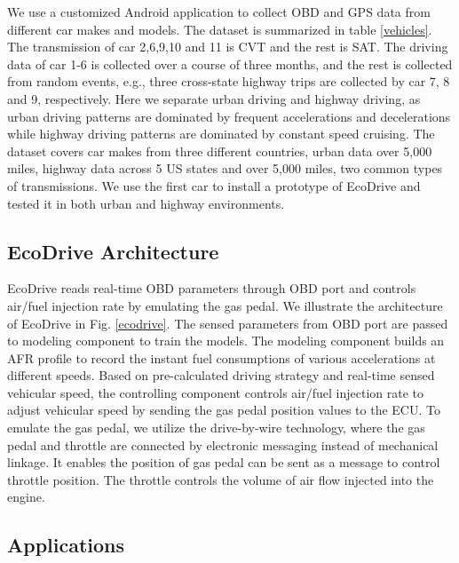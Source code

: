 

We use a customized Android application to collect OBD and GPS data 
from different car makes and models.
The dataset is summarized in table \ref{vehicles}.
The transmission of car 2,6,9,10 and 11 is CVT and the rest is SAT. 
The driving data of car 1-6 is collected over a course of three months, 
and the rest is collected from random events, 
e.g., three cross-state highway trips are collected by car 7, 8 and 9, 
respectively. 
Here we separate urban driving and highway driving,
as urban driving patterns are dominated by frequent 
accelerations and decelerations while 
highway driving patterns are dominated by 
constant speed cruising. 
The dataset covers car makes from three different countries, 
urban data over 5,000 miles, highway data across 5 US states and 
over 5,000 miles, two common types of transmissions. 
We use the first car to install a prototype of EcoDrive and tested
it in both urban and highway environments. 




\subsection{EcoDrive Architecture}

EcoDrive reads real-time OBD parameters through OBD port
and controls air/fuel injection rate by emulating the gas pedal.
We illustrate the architecture of EcoDrive in Fig. \ref{ecodrive}.
The sensed parameters from OBD port are passed to modeling component
to train the models.
The modeling component builds an AFR profile to 
record the instant fuel consumptions of various 
accelerations at different speeds.
Based on pre-calculated driving strategy and real-time sensed vehicular speed, 
the controlling component controls air/fuel injection rate to adjust vehicular speed by 
sending the gas pedal position values to the ECU. 
To emulate the gas pedal, we utilize the drive-by-wire technology, 
where the gas pedal and throttle are connected by electronic messaging instead of mechanical linkage.   
It enables the position of gas pedal can be sent as a message
to control throttle position. 
The throttle controls the volume of air flow injected into the engine. 
 


\subsection{Applications}

